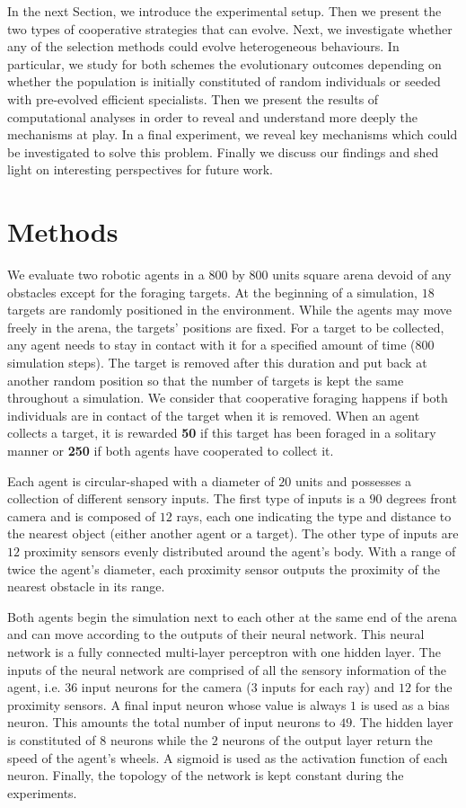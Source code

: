   In the next Section, we introduce the experimental setup. Then we present the two types of cooperative strategies that can evolve. Next, we investigate whether any of the selection methods could evolve heterogeneous behaviours. In particular, we study for both schemes the evolutionary outcomes depending on whether the population is initially constituted of random individuals or seeded with pre-evolved efficient specialists. Then we present the results of computational analyses in order to reveal and understand more deeply the mechanisms at play. In a final experiment, we reveal key mechanisms which could be investigated to solve this problem. Finally we discuss our findings and shed light on interesting perspectives for future work.




\section{Methods}
\label{sec:methods}
  We evaluate two robotic agents in a $800$ by $800$ units square arena devoid of any obstacles except for the foraging targets. At the beginning of a simulation, $18$ targets are randomly positioned in the environment. While the agents may move freely in the arena, the targets' positions are fixed. For a target to be collected, any agent needs to stay in contact with it for a specified amount of time ($800$ simulation steps). The target is removed after this duration and put back at another random position so that the number of targets is kept the same throughout a simulation. We consider that cooperative foraging happens if both individuals are in contact of the target when it is removed. When an agent collects a target, it is rewarded \textbf{50} if this target has been foraged in a solitary manner or \textbf{250} if both agents have cooperated to collect it.

  Each agent is circular-shaped with a diameter of $20$ units and possesses a collection of different sensory inputs. The first type of inputs is a $90$ degrees front camera and is composed of $12$ rays, each one indicating the type and distance to the nearest object (either another agent or a target). The other type of inputs are $12$ proximity sensors evenly distributed around the agent's body. With a range of twice the agent's diameter, each proximity sensor outputs the proximity of the nearest obstacle in its range.

  Both agents begin the simulation next to each other at the same end of the arena and can move according to the outputs of their neural network. This neural network is a fully connected multi-layer perceptron with one hidden layer. The inputs of the neural network are comprised of all the sensory information of the agent, i.e. $36$ input neurons for the camera ($3$ inputs for each ray) and $12$ for the proximity sensors. A final input neuron whose value is always $1$ is used as a bias neuron. This amounts the total number of input neurons to $49$. The hidden layer is constituted of $8$ neurons while the $2$ neurons of the output layer return the speed of the agent's wheels. A sigmoid is used as the activation function of each neuron. Finally, the topology of the network is kept constant during the experiments.

